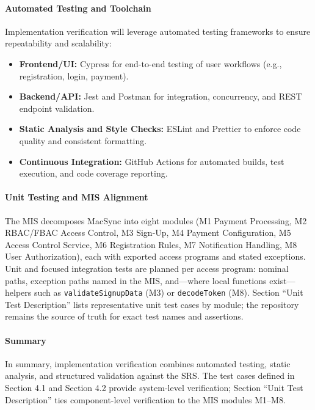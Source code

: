\documentclass[12pt, titlepage]{article}
\begin{document}
\paragraph{Automated Testing and Toolchain}
\noindent \newline
Implementation verification will leverage automated testing frameworks to ensure repeatability and scalability:
\begin{itemize}
    \item \textbf{Frontend/UI:} Cypress for end-to-end testing of user workflows (e.g., registration, login, payment).
    \item \textbf{Backend/API:} Jest and Postman for integration, concurrency, and REST endpoint validation.
    \item \textbf{Static Analysis and Style Checks:} ESLint and Prettier to enforce code quality and consistent formatting.
    \item \textbf{Continuous Integration:} GitHub Actions for automated builds, test execution, and code coverage reporting.
\end{itemize}

\paragraph{Unit Testing and MIS Alignment}
\noindent \newline
The MIS \citet{SL-MIS} decomposes MacSync into eight modules (M1 Payment Processing, M2 RBAC/FBAC Access Control, M3 Sign-Up, M4 Payment Configuration, M5 Access Control Service, M6 Registration Rules, M7 Notification Handling, M8 User Authorization), each with exported access programs and stated exceptions. Unit and focused integration tests are planned per access program: nominal paths, exception paths named in the MIS, and---where local functions exist---helpers such as \texttt{validateSignupData} (M3) or \texttt{decodeToken} (M8). Section ``Unit Test Description'' lists representative unit test cases by module; the repository remains the source of truth for exact test names and assertions.

\paragraph{Summary}
\noindent \newline
In summary, implementation verification combines automated testing, static analysis, and structured validation against the SRS. The test cases defined in Section 4.1 and Section 4.2 provide system-level verification; Section ``Unit Test Description'' ties component-level verification to the MIS modules M1--M8.
\end{document}
